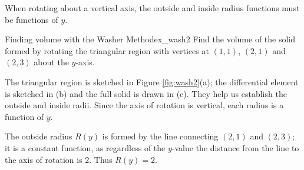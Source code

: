 When rotating about a vertical axis, the outside and inside radius functions must be functions of $y$.\\


\begin{example}{Finding volume with the Washer Method}{ex_wash2}{
Find the volume of the solid formed by rotating the triangular region with vertices at $(1,1)$, $(2,1)$ and $(2,3)$ about the $y$-axis.}
\end{example}


\begin{solution}
{The triangular region is sketched in Figure \ref{fig:wash2}(a); the differential element is sketched in (b) and the full solid is drawn in (c). They help us establish the outside and inside radii. Since the axis of rotation is vertical, each radius is a function of $y$. 

The outside radius $R(y)$ is formed by the line connecting $(2,1)$ and $(2,3)$; it is a constant function, as regardless of the $y$-value the distance from the line to the axis of rotation is 2. Thus $R(y)=2$. 

}
\end{solution}
